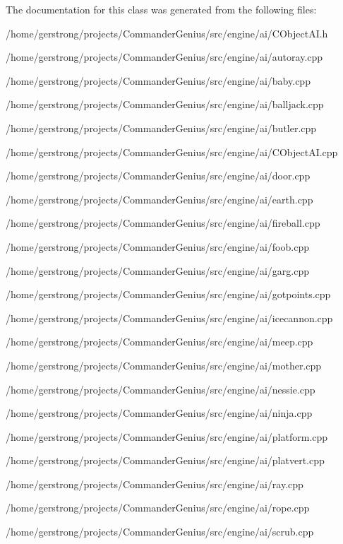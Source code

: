 The documentation for this class was generated from the following files:\begin{DoxyCompactItemize}
\item 
/home/gerstrong/projects/CommanderGenius/src/engine/ai/CObjectAI.h\item 
/home/gerstrong/projects/CommanderGenius/src/engine/ai/autoray.cpp\item 
/home/gerstrong/projects/CommanderGenius/src/engine/ai/baby.cpp\item 
/home/gerstrong/projects/CommanderGenius/src/engine/ai/balljack.cpp\item 
/home/gerstrong/projects/CommanderGenius/src/engine/ai/butler.cpp\item 
/home/gerstrong/projects/CommanderGenius/src/engine/ai/CObjectAI.cpp\item 
/home/gerstrong/projects/CommanderGenius/src/engine/ai/door.cpp\item 
/home/gerstrong/projects/CommanderGenius/src/engine/ai/earth.cpp\item 
/home/gerstrong/projects/CommanderGenius/src/engine/ai/fireball.cpp\item 
/home/gerstrong/projects/CommanderGenius/src/engine/ai/foob.cpp\item 
/home/gerstrong/projects/CommanderGenius/src/engine/ai/garg.cpp\item 
/home/gerstrong/projects/CommanderGenius/src/engine/ai/gotpoints.cpp\item 
/home/gerstrong/projects/CommanderGenius/src/engine/ai/icecannon.cpp\item 
/home/gerstrong/projects/CommanderGenius/src/engine/ai/meep.cpp\item 
/home/gerstrong/projects/CommanderGenius/src/engine/ai/mother.cpp\item 
/home/gerstrong/projects/CommanderGenius/src/engine/ai/nessie.cpp\item 
/home/gerstrong/projects/CommanderGenius/src/engine/ai/ninja.cpp\item 
/home/gerstrong/projects/CommanderGenius/src/engine/ai/platform.cpp\item 
/home/gerstrong/projects/CommanderGenius/src/engine/ai/platvert.cpp\item 
/home/gerstrong/projects/CommanderGenius/src/engine/ai/ray.cpp\item 
/home/gerstrong/projects/CommanderGenius/src/engine/ai/rope.cpp\item 
/home/gerstrong/projects/CommanderGenius/src/engine/ai/scrub.cpp\item 

\end{DoxyCompactItemize}
